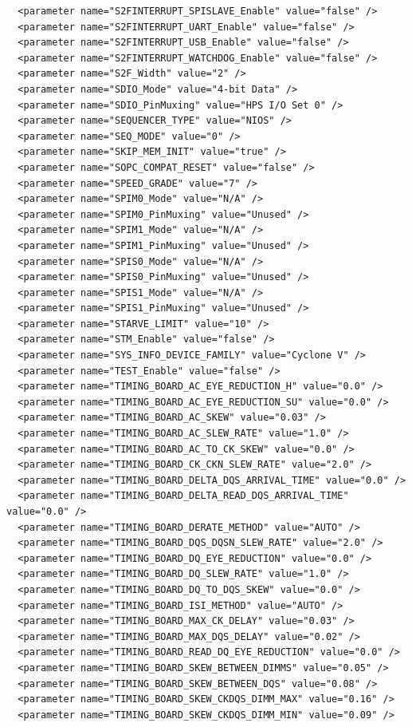 \documentclass[conference]{IEEEtran}
\begin{document}
\begin{lstlisting}
  <parameter name="S2FINTERRUPT_SPISLAVE_Enable" value="false" />
  <parameter name="S2FINTERRUPT_UART_Enable" value="false" />
  <parameter name="S2FINTERRUPT_USB_Enable" value="false" />
  <parameter name="S2FINTERRUPT_WATCHDOG_Enable" value="false" />
  <parameter name="S2F_Width" value="2" />
  <parameter name="SDIO_Mode" value="4-bit Data" />
  <parameter name="SDIO_PinMuxing" value="HPS I/O Set 0" />
  <parameter name="SEQUENCER_TYPE" value="NIOS" />
  <parameter name="SEQ_MODE" value="0" />
  <parameter name="SKIP_MEM_INIT" value="true" />
  <parameter name="SOPC_COMPAT_RESET" value="false" />
  <parameter name="SPEED_GRADE" value="7" />
  <parameter name="SPIM0_Mode" value="N/A" />
  <parameter name="SPIM0_PinMuxing" value="Unused" />
  <parameter name="SPIM1_Mode" value="N/A" />
  <parameter name="SPIM1_PinMuxing" value="Unused" />
  <parameter name="SPIS0_Mode" value="N/A" />
  <parameter name="SPIS0_PinMuxing" value="Unused" />
  <parameter name="SPIS1_Mode" value="N/A" />
  <parameter name="SPIS1_PinMuxing" value="Unused" />
  <parameter name="STARVE_LIMIT" value="10" />
  <parameter name="STM_Enable" value="false" />
  <parameter name="SYS_INFO_DEVICE_FAMILY" value="Cyclone V" />
  <parameter name="TEST_Enable" value="false" />
  <parameter name="TIMING_BOARD_AC_EYE_REDUCTION_H" value="0.0" />
  <parameter name="TIMING_BOARD_AC_EYE_REDUCTION_SU" value="0.0" />
  <parameter name="TIMING_BOARD_AC_SKEW" value="0.03" />
  <parameter name="TIMING_BOARD_AC_SLEW_RATE" value="1.0" />
  <parameter name="TIMING_BOARD_AC_TO_CK_SKEW" value="0.0" />
  <parameter name="TIMING_BOARD_CK_CKN_SLEW_RATE" value="2.0" />
  <parameter name="TIMING_BOARD_DELTA_DQS_ARRIVAL_TIME" value="0.0" />
  <parameter name="TIMING_BOARD_DELTA_READ_DQS_ARRIVAL_TIME" value="0.0" />
  <parameter name="TIMING_BOARD_DERATE_METHOD" value="AUTO" />
  <parameter name="TIMING_BOARD_DQS_DQSN_SLEW_RATE" value="2.0" />
  <parameter name="TIMING_BOARD_DQ_EYE_REDUCTION" value="0.0" />
  <parameter name="TIMING_BOARD_DQ_SLEW_RATE" value="1.0" />
  <parameter name="TIMING_BOARD_DQ_TO_DQS_SKEW" value="0.0" />
  <parameter name="TIMING_BOARD_ISI_METHOD" value="AUTO" />
  <parameter name="TIMING_BOARD_MAX_CK_DELAY" value="0.03" />
  <parameter name="TIMING_BOARD_MAX_DQS_DELAY" value="0.02" />
  <parameter name="TIMING_BOARD_READ_DQ_EYE_REDUCTION" value="0.0" />
  <parameter name="TIMING_BOARD_SKEW_BETWEEN_DIMMS" value="0.05" />
  <parameter name="TIMING_BOARD_SKEW_BETWEEN_DQS" value="0.08" />
  <parameter name="TIMING_BOARD_SKEW_CKDQS_DIMM_MAX" value="0.16" />
  <parameter name="TIMING_BOARD_SKEW_CKDQS_DIMM_MIN" value="0.09" />

\end{lstlisting}
\end{document}
